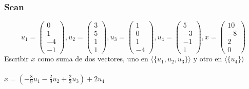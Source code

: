\documentclass{article}
\begin{document}
\subsubsection{Sean}
\[
u_1 = \begin{pmatrix}0\\1\\-4\\-1\end{pmatrix}, u_2 = \begin{pmatrix}3\\5\\1\\1\end{pmatrix},
u_3 = \begin{pmatrix}1\\0\\1\\-4\end{pmatrix}, u_4 = \begin{pmatrix}5\\-3\\-1\\1\end{pmatrix},
x = \begin{pmatrix}10\\-8\\2\\0\end{pmatrix}
\]
Escribir $x$ como suma de dos vectores, uno en $\langle \{ u_1,u_2,u_3 \} \rangle$ y otro en 
$\langle \{ u_4 \} \rangle$ \\ \\
$x = ( -\frac{8}9 u_1 - \frac{2}9 u_2 + \frac{2}3 u_3)+2u_4$
\end{document}
